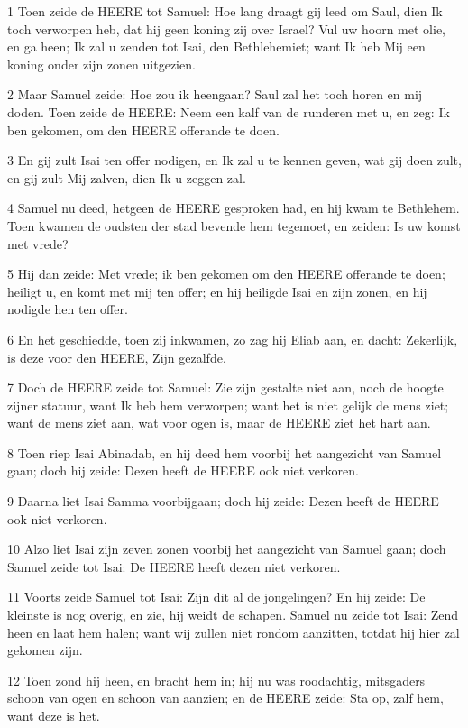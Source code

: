 \par 1 Toen zeide de HEERE tot Samuel: Hoe lang draagt gij leed om Saul, dien Ik toch verworpen heb, dat hij geen koning zij over Israel? Vul uw hoorn met olie, en ga heen; Ik zal u zenden tot Isai, den Bethlehemiet; want Ik heb Mij een koning onder zijn zonen uitgezien.
\par 2 Maar Samuel zeide: Hoe zou ik heengaan? Saul zal het toch horen en mij doden. Toen zeide de HEERE: Neem een kalf van de runderen met u, en zeg: Ik ben gekomen, om den HEERE offerande te doen.
\par 3 En gij zult Isai ten offer nodigen, en Ik zal u te kennen geven, wat gij doen zult, en gij zult Mij zalven, dien Ik u zeggen zal.
\par 4 Samuel nu deed, hetgeen de HEERE gesproken had, en hij kwam te Bethlehem. Toen kwamen de oudsten der stad bevende hem tegemoet, en zeiden: Is uw komst met vrede?
\par 5 Hij dan zeide: Met vrede; ik ben gekomen om den HEERE offerande te doen; heiligt u, en komt met mij ten offer; en hij heiligde Isai en zijn zonen, en hij nodigde hen ten offer.
\par 6 En het geschiedde, toen zij inkwamen, zo zag hij Eliab aan, en dacht: Zekerlijk, is deze voor den HEERE, Zijn gezalfde.
\par 7 Doch de HEERE zeide tot Samuel: Zie zijn gestalte niet aan, noch de hoogte zijner statuur, want Ik heb hem verworpen; want het is niet gelijk de mens ziet; want de mens ziet aan, wat voor ogen is, maar de HEERE ziet het hart aan.
\par 8 Toen riep Isai Abinadab, en hij deed hem voorbij het aangezicht van Samuel gaan; doch hij zeide: Dezen heeft de HEERE ook niet verkoren.
\par 9 Daarna liet Isai Samma voorbijgaan; doch hij zeide: Dezen heeft de HEERE ook niet verkoren.
\par 10 Alzo liet Isai zijn zeven zonen voorbij het aangezicht van Samuel gaan; doch Samuel zeide tot Isai: De HEERE heeft dezen niet verkoren.
\par 11 Voorts zeide Samuel tot Isai: Zijn dit al de jongelingen? En hij zeide: De kleinste is nog overig, en zie, hij weidt de schapen. Samuel nu zeide tot Isai: Zend heen en laat hem halen; want wij zullen niet rondom aanzitten, totdat hij hier zal gekomen zijn.
\par 12 Toen zond hij heen, en bracht hem in; hij nu was roodachtig, mitsgaders schoon van ogen en schoon van aanzien; en de HEERE zeide: Sta op, zalf hem, want deze is het.

